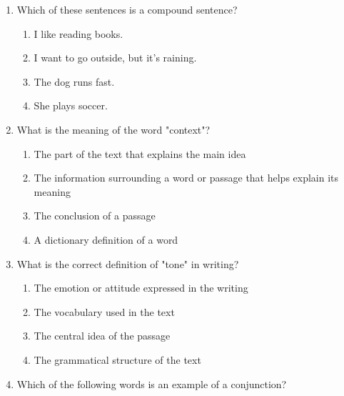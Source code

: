 \documentclass[12pt]{article}
\begin{document}
\begin{enumerate}
    \vspace{0.5cm}

    \item Which of these sentences is a compound sentence?

    \begin{enumerate}[label=\Alph*.]
        \item I like reading books.
        \item I want to go outside, but it’s raining.
        \item The dog runs fast.
        \item She plays soccer.
    \end{enumerate}

    \vspace{0.5cm}

    \item What is the meaning of the word "context"?

    \begin{enumerate}[label=\Alph*.]
        \item The part of the text that explains the main idea
        \item The information surrounding a word or passage that helps explain its meaning
        \item The conclusion of a passage
        \item A dictionary definition of a word
    \end{enumerate}

    \vspace{0.5cm}

    \item What is the correct definition of "tone" in writing?

    \begin{enumerate}[label=\Alph*.]
        \item The emotion or attitude expressed in the writing
        \item The vocabulary used in the text
        \item The central idea of the passage
        \item The grammatical structure of the text
    \end{enumerate}

    \vspace{0.5cm}

    \item Which of the following words is an example of a conjunction?


\end{enumerate}
\end{document}
